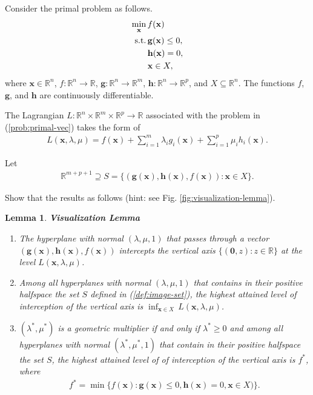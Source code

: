 \documentclass[11pt,letter,notitlepage]{article}
\newtheorem{lemma}{Lemma}
\begin{document}
\newpage
\begin{exercise}
Consider the primal problem as follows.
\begin{align}\label{prob:primal-vec}
\min_{\mathbf{x}}\,&f(\mathbf{x})\\ \nonumber
{\rm s.t.}\,&\mathbf{g}(\mathbf{x})\leq0,\\ \nonumber
&\mathbf{h}(\mathbf{x})=0, \\ \nonumber
&\mathbf{x}\in X,
\end{align}
where $\mathbf{x}\in\mathbb{R}^n$, $f:\mathbb{R}^n\rightarrow\mathbb{R}$, $\mathbf{g}:\mathbb{R}^n\rightarrow\mathbb{R}^m$, $\mathbf{h}:\mathbb{R}^n\rightarrow\mathbb{R}^p$, and $X\subseteq\mathbb{R}^n$. The functions $f$, $\mathbf{g}$, and $\mathbf{h}$ are continuously differentiable. 

The Lagrangian $L:\mathbb{R}^n\times \mathbb{R}^m\times \mathbb{R}^p\rightarrow\mathbb{R}$ associated with the problem in (\ref{prob:primal-vec}) takes the form of
\begin{align}\label{def:Lagrangian}
	L(\mathbf{x},\lambda,\mu)=f(\mathbf{x})+\sum_{i=1}^m\lambda_ig_i(\mathbf{x})+\sum_{i=1}^p\mu_ih_i(\mathbf{x}).
\end{align}

Let
\begin{align}\label{def:image-set}
	\mathbb{R}^{m+p+1}\supseteq S=\{(\mathbf{g}(\mathbf{x}),\mathbf{h}(\mathbf{x}),f(\mathbf{x})):\mathbf{x}\in X\}.
\end{align}

Show that the results as follows (hint: see Fig. \ref{fig:visualization-lemma}).

\begin{lemma}
	\textbf{\textup {Visualization Lemma}}
	\begin{enumerate}
		\item The hyperplane with normal $(\lambda,\mu,1)$ that passes through a vector $(\mathbf{g}(\mathbf{x}),\mathbf{h}(\mathbf{x}),f(\mathbf{x}))$ intercepts the vertical axis $\{(\mathbf{0},z):z\in\mathbb{R}\}$ at the level $L(\mathbf{x},\lambda,\mu)$.
		
		\item Among all hyperplanes with normal $(\lambda,\mu,1)$ that contains in their positive halfspace the set $S$ defined in (\ref{def:image-set}), the highest attained level of interception of the vertical axis is $\inf_{\mathbf{x}\in X}\,L(\mathbf{x},\lambda,\mu)$.
		
		\item $(\lambda^*,\mu^*)$ is a geometric multiplier if and only if $\lambda^*\geq0$ and among all hyperplanes with normal $(\lambda^*,\mu^*,1)$ that contain in their positive halfspace the set $S$, the highest attained level of of interception of the vertical axis is $f^*$, where
		\begin{align*}
		    f^*=\min\{f(\mathbf{x}):\mathbf{g}(\mathbf{x})\leq0,\mathbf{h}(\mathbf{x})=0,\mathbf{x}\in X)\}.
		\end{align*}
	\end{enumerate}
\end{lemma}
\end{exercise}
\end{document}
